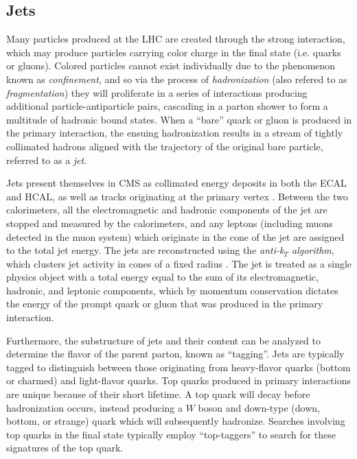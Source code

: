 \subsection{Jets}
\label{subsec:jets}
Many particles produced at the LHC are created through the strong interaction, which may produce particles carrying color charge in the final state (i.e. quarks or gluons). Colored particles cannot exist individually due to the phenomenon known as {\it confinement}, and so via the process of {\it hadronization} (also refered to as {\it fragmentation}) they will proliferate in a series of interactions producing additional particle-antiparticle pairs, cascading in a parton shower to form a multitude of hadronic bound states. When a ``bare'' quark or gluon is produced in the primary interaction, the ensuing hadronization results in a stream of tightly collimated hadrons aligned with the trajectory of the original bare particle, referred to as a {\it jet}. 

Jets present themselves in CMS as collimated energy deposits in both the ECAL and HCAL, as well as tracks originating at the primary vertex \cite{Schroder:2015czj}. Between the two calorimeters, all the electromagnetic and hadronic components of the jet are stopped and measured by the calorimeters, and any leptons (including muons detected in the muon system) which originate in the cone of the jet are assigned to the total jet energy. The jets are reconstructed using the {\it anti-k$_T$ algorithm}, which clusters jet activity in cones of a fixed radius \cite{Cacciari:2008gp}. The jet is treated as a single physics object with a total energy equal to the sum of its electromagnetic, hadronic, and leptonic components, which by momentum conservation dictates the energy of the prompt quark or gluon that was produced in the primary interaction. 

Furthermore, the substructure of jets and their content can be analyzed to determine the flavor of the parent parton, known as ``tagging''. Jets are typically tagged to distinguish between those originating from heavy-flavor quarks (bottom or charmed) and light-flavor quarks. Top quarks produced in primary interactions are unique because of their short lifetime. A top quark will decay before hadronization occurs, instead producing a $W$ boson and down-type (down, bottom, or strange) quark which will subsequently hadronize. Searches involving top quarks in the final state typically employ ``top-taggers'' to search for these signatures of the top quark.

